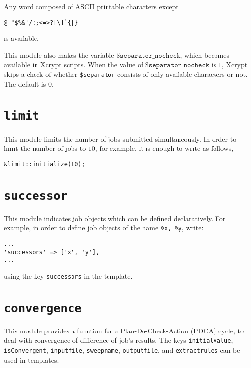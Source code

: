 \documentclass[a4paper,10pt]{report}
\begin{document}
Any word composed of ASCII printable characters except
\begin{center}
\verb*+@ "$%&'/:;<=>?[\]`{|}+        %
\end{center}
is available.

This module also makes the variable $\texttt{\$separator\_nocheck}$,
which becomes available in Xcrypt scripts.  When the value of
$\texttt{\$separator\_nocheck}$ is $1$, Xcrypt skips a check of
whether \texttt{\$separator} consists of only available characters or not.
The default is $0$.

\section{\texttt{limit}}

This module limits the number of jobs submitted simultaneously.
In order to limit the number of jobs to $10$, for example, it is enough to
write as follows,
\begin{boxnote}
\begin{verbatim}
&limit::initialize(10);
\end{verbatim}
\end{boxnote}

\section{\texttt{successor}}

This module indicates job objects which can be defined declaratively.
For example, in order to define job objects of the name \texttt{\%x,
\%y}, write:
\begin{boxnote}
\begin{verbatim}
...
'successors' => ['x', 'y'],
...
\end{verbatim}
\end{boxnote}
\vspace{\baselineskip}
\noindent
using the key \texttt{successors} in the template.

\section{\texttt{convergence}}

This module provides a function for a Plan-Do-Check-Action (PDCA)
cycle, to deal with convergence of difference of job's results.  The
keys \texttt{initialvalue}, \texttt{isConvergent}, \texttt{inputfile},
\texttt{sweepname}, \texttt{outputfile}, and \texttt{extractrules} can
be used in templates.
\end{document}
